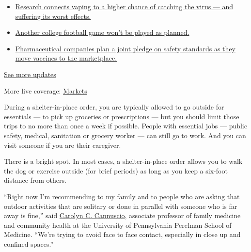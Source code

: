 \begin{itemize}
\tightlist
\item
  \href{https://www.nytimes3xbfgragh.onion/2020/09/04/world/covid-19-coronavirus.html?action=click\&pgtype=Article\&state=default\&region=MAIN_CONTENT_1\&context=storylines_live_updates\#link-1654f6ad}{Research
  connects vaping to a higher chance of catching the virus --- and
  suffering its worst effects.}
\item
  \href{https://www.nytimes3xbfgragh.onion/2020/09/04/world/covid-19-coronavirus.html?action=click\&pgtype=Article\&state=default\&region=MAIN_CONTENT_1\&context=storylines_live_updates\#link-52e4198a}{Another
  college football game won't be played as planned.}
\item
  \href{https://www.nytimes3xbfgragh.onion/2020/09/04/world/covid-19-coronavirus.html?action=click\&pgtype=Article\&state=default\&region=MAIN_CONTENT_1\&context=storylines_live_updates\#link-181cef0}{Pharmaceutical
  companies plan a joint pledge on safety standards as they move
  vaccines to the marketplace.}
\end{itemize}

\href{https://www.nytimes3xbfgragh.onion/2020/09/04/world/covid-19-coronavirus.html?action=click\&pgtype=Article\&state=default\&region=MAIN_CONTENT_1\&context=storylines_live_updates}{See
more updates}

More live coverage:
\href{https://www.nytimes3xbfgragh.onion/live/2020/09/04/business/stock-market-today-coronavirus?action=click\&pgtype=Article\&state=default\&region=MAIN_CONTENT_1\&context=storylines_live_updates}{Markets}

During a shelter-in-place order, you are typically allowed to go outside
for essentials --- to pick up groceries or prescriptions --- but you
should limit those trips to no more than once a week if possible. People
with essential jobs --- public safety, medical, sanitation or grocery
worker --- can still go to work. And you can visit someone if you are
their caregiver.

There is a bright spot. In most cases, a shelter-in-place order allows
you to walk the dog or exercise outside (for brief periods) as long as
you keep a six-foot distance from others.

``Right now I'm recommending to my family and to people who are asking
that outdoor activities that are solitary or done in parallel with
someone who is far away is fine,'' said
\href{https://www.med.upenn.edu/apps/faculty/index.php/g275/p6153664}{Carolyn
C. Cannuscio}, associate professor of family medicine and community
health at the University of Pennsylvania Perelman School of Medicine.
``We're trying to avoid face to face contact, especially in close up and
confined spaces.''

